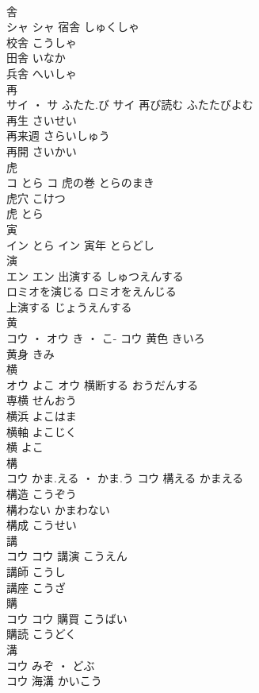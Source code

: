 \documentclass[8pt]{extreport}
\begin{document}
\begin{CJK}{UTF8}{min}
\\	舎	
\\	シャ		シャ	宿舎	しゅくしゃ	
\\	校舎	こうしゃ	
\\	田舎	いなか	
\\	兵舎	へいしゃ	
\\	再	
\\	サイ ・ サ	ふたた.び	サイ	再び読む	ふたたびよむ	
\\	再生	さいせい	
\\	再来週	さらいしゅう	
\\	再開	さいかい	
\\	虎	
\\	コ	とら	コ	虎の巻	とらのまき	
\\	虎穴	こけつ	
\\	虎	とら	
\\	寅	
\\	イン	とら	イン	寅年	とらどし	
\\	演	
\\	エン		エン	出演する	しゅつえんする	
\\	ロミオを演じる	ロミオをえんじる	
\\	上演する	じょうえんする	
\\	黄	
\\	コウ ・ オウ	き ・ こ-	コウ	黄色	きいろ	
\\	黄身	きみ	
\\	横	
\\	オウ	よこ	オウ	横断する	おうだんする	
\\	専横	せんおう	
\\	横浜	よこはま	
\\	横軸	よこじく	
\\	横	よこ	
\\	構	
\\	コウ	かま.える ・ かま.う	コウ	構える	かまえる	
\\	構造	こうぞう	
\\	構わない	かまわない	
\\	構成	こうせい	
\\	講	
\\	コウ		コウ	講演	こうえん	
\\	講師	こうし	
\\	講座	こうざ	
\\	購	
\\	コウ		コウ	購買	こうばい	
\\	購読	こうどく	
\\	溝	
\\	コウ	みぞ ・ どぶ
\\	コウ	海溝	かいこう	

\end{CJK}
\end{document}
